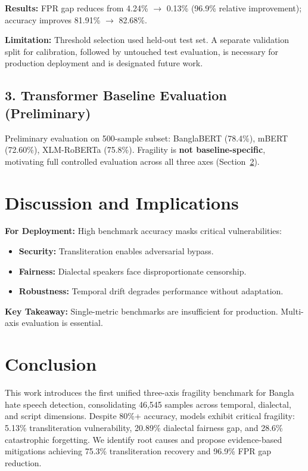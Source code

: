 \documentclass[conference]{IEEEtran}
\begin{document}
\textbf{Results:} FPR gap reduces from 4.24\% $\rightarrow$ 0.13\% (96.9\% relative improvement); accuracy improves 81.91\% $\rightarrow$ 82.68\%.

\textbf{Limitation:} Threshold selection used held-out test set. A separate validation split for calibration, followed by untouched test evaluation, is necessary for production deployment and is designated future work.

\subsection{3. Transformer Baseline Evaluation (Preliminary)}

Preliminary evaluation on 500-sample subset: BanglaBERT (78.4\%), mBERT (72.60\%), XLM-RoBERTa (75.8\%). Fragility is \textbf{not baseline-specific}, motivating full controlled evaluation across all three axes (Section~\ref{sec:conclusion}).

\section{Discussion and Implications}

\textbf{For Deployment:} High benchmark accuracy masks critical vulnerabilities:
\begin{itemize}
\item \textbf{Security:} Transliteration enables adversarial bypass.
\item \textbf{Fairness:} Dialectal speakers face disproportionate censorship.
\item \textbf{Robustness:} Temporal drift degrades performance without adaptation.
\end{itemize}

\textbf{Key Takeaway:} Single-metric benchmarks are insufficient for production. Multi-axis evaluation is essential.

\section{Conclusion}
\label{sec:conclusion}

This work introduces the first unified three-axis fragility benchmark for Bangla hate speech detection, consolidating 46,545 samples across temporal, dialectal, and script dimensions. Despite 80\%+ accuracy, models exhibit critical fragility: 5.13\% transliteration vulnerability, 20.89\% dialectal fairness gap, and 28.6\% catastrophic forgetting. We identify root causes and propose evidence-based mitigations achieving 75.3\% transliteration recovery and 96.9\% FPR gap reduction.
\end{document}
